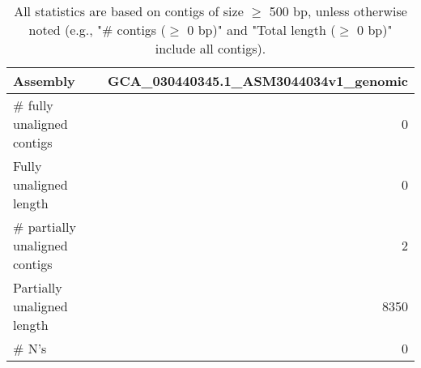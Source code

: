 \documentclass[12pt,a4paper]{article}
\begin{document}
\begin{table}[ht]
\begin{center}
\caption{All statistics are based on contigs of size $\geq$ 500 bp, unless otherwise noted (e.g., "\# contigs ($\geq$ 0 bp)" and "Total length ($\geq$ 0 bp)" include all contigs).}
\begin{tabular}{|l*{1}{|r}|}
\hline
Assembly & GCA\_030440345.1\_ASM3044034v1\_genomic \\ \hline
\# fully unaligned contigs & 0 \\ \hline
Fully unaligned length & 0 \\ \hline
\# partially unaligned contigs & 2 \\ \hline
Partially unaligned length & 8350 \\ \hline
\# N's & 0 \\ \hline
\end{tabular}
\end{center}
\end{table}
\end{document}
